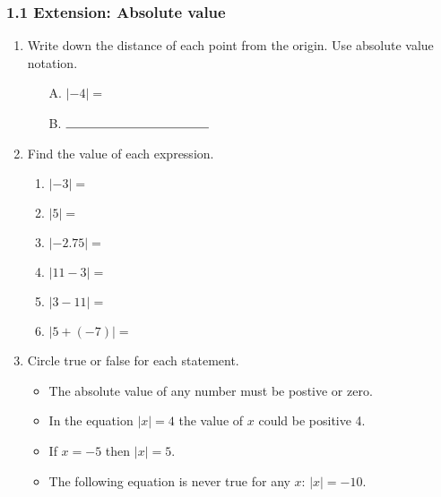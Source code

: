 

\fancyhead[LE]{\thepage}


\subsubsection*{1.1 Extension: Absolute value}
\begin{enumerate}
\item Write down the distance of each point from the origin. Use absolute value notation. \par \bigskip
   \bigskip
  \begin{multicols}{2}
    \begin{enumerate}
      \item[A.] $|-4|=$
      \item[B.] $\rule{4cm}{0.15mm}$
    \end{enumerate}
  \end{multicols} \bigskip
  
\item Find the value of each expression.
  \begin{multicols}{2}
    \begin{enumerate}[itemsep=1cm]
      \item $|-3|=$
      \item $|5|=$
      \item $|-2.75|=$
      \item $|11-3|=$
      \item $|3-11|=$
      \item $|5+(-7)|=$
    \end{enumerate}
  \end{multicols} \bigskip

\item Circle true or false for each statement. \bigskip
  \begin{itemize}[label={\textbf{T \; F \;}}, itemsep=0.5cm]
    \item The absolute value of any number must be postive or zero.
    \item In the equation $|x|=4$ the value of $x$ could be positive 4.
    \item If $x=-5$ then $|x|=5$.
    \item The following equation is never true for any $x$: $|x|=-10$.
  \end{itemize} \bigskip


\end{enumerate}
